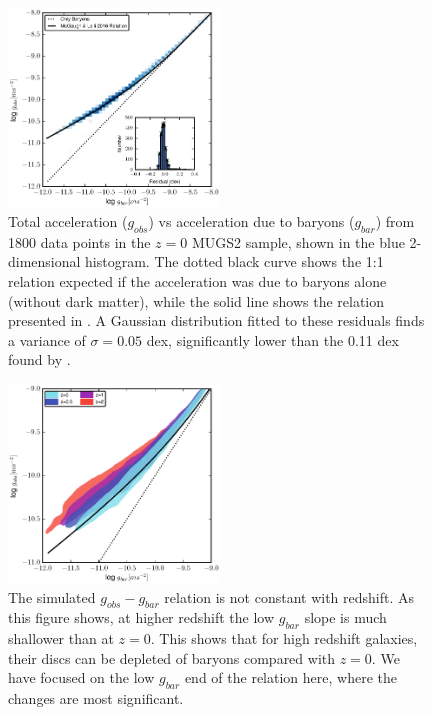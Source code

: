 \begin{figure}
    \includegraphics[width=0.5\textwidth]{figures4/SPARC_plot.eps}
    \caption[Total acceleration vs. baryonic acceleration in MUGS2]{Total
    acceleration ($g_{obs}$) vs acceleration due to baryons ($g_{bar}$) from
    1800 data points in the $z=0$ MUGS2 sample, shown in the blue 2-dimensional
    histogram.  The dotted black curve shows the 1:1 relation expected if the
    acceleration was due to baryons alone (without dark matter), while the solid
    line shows the relation presented in \citet{McGaugh2016}.  A Gaussian
    distribution fitted to these residuals finds a variance of $\sigma=0.05$
    dex, significantly lower than the 0.11 dex found by \citet{McGaugh2016}.}
    \label{SPARC_plot}
\end{figure}
\begin{figure}
    \includegraphics[width=0.5\textwidth]{figures4/redshift_evolution.eps}
    \caption[Redshift evolution of acceleration relation]{The  simulated
    $g_{obs}-g_{bar}$ relation is not constant with redshift.  As this figure
    shows, at higher redshift the low $g_{bar}$ slope is much shallower than at
    $z=0$.  This shows that for high redshift galaxies, their discs can be
    depleted of baryons compared with $z=0$.  We have focused on the low
    $g_{bar}$ end of the relation here, where the changes are most significant.}
    \label{redshift_evolution}
\end{figure}
